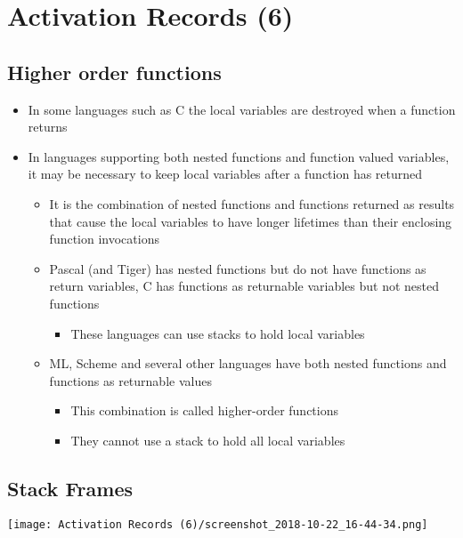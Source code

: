 \documentclass[11pt]{article}
\begin{document}
\section{Activation Records (6)}
\label{sec:orgf3253fe}
\subsection{Higher order functions}
\label{sec:orgd986a56}
\begin{itemize}
\item In some languages such as C the local variables are destroyed when a function returns
\item In languages supporting both nested functions and function valued variables, it may be necessary to keep local variables after a function has returned
\begin{itemize}
\item It is the combination of nested functions and functions returned as results that cause the local variables to have longer lifetimes than their enclosing function invocations
\item Pascal (and Tiger) has nested functions but do not have functions as return variables, C has functions as returnable variables but not nested functions
\begin{itemize}
\item These languages can use stacks to hold local variables
\end{itemize}
\item ML, Scheme and several other languages have both nested functions and functions as returnable values
\begin{itemize}
\item This combination is called higher-order functions
\item They cannot use a stack to hold all local variables
\end{itemize}
\end{itemize}
\end{itemize}

\subsection{Stack Frames}
\label{sec:orgc2b04a0}
\begin{center}
\texttt{[image: Activation Records (6)/screenshot\_2018-10-22\_16-44-34.png]}
\end{center}
\end{document}
